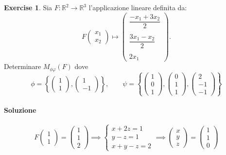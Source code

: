 \documentclass{article}
\theoremstyle{plain}
\theoremstyle{definition}
\newtheorem{xca}[exmp]{Exercise}
\theoremstyle{remark}
\begin{document}
\begin{bxthm}
\begin{xca}
    Sia $F:\mathbb{R}^2\to\mathbb{R}^3$ l'applicazione lineare definita da:
    \[F\begin{pmatrix}
        x_1\\
        x_2
    \end{pmatrix}\mapsto\begin{pmatrix}
        \dfrac{-x_1+3x_2}{2}\\\\
        \dfrac{3x_1-x_2}{2}\\\\
        2x_1
    \end{pmatrix}.\]
    Determinare $M_{\phi\varphi}(F)$ dove 
    \[\phi=\left\{\begin{pmatrix}
        1\\
        1
    \end{pmatrix},\begin{pmatrix}
        1\\
        -1
    \end{pmatrix}\right\}, \quad\quad  \psi=\left\{\begin{pmatrix}
        1\\
        0\\
        1
    \end{pmatrix},\begin{pmatrix}
        0\\
        1\\
        1
    \end{pmatrix},\begin{pmatrix}
        2\\
        -1\\
        -1
    \end{pmatrix}\right\}
    \]
\end{xca}
\end{bxthm}
\paragraph{Soluzione}
\[F\begin{pmatrix}1\\1\end{pmatrix}=\begin{pmatrix}1\\1\\2\end{pmatrix}\implies
\begin{cases}
    x+2z=1\\
    y-z=1\\
    x+y-z=2
\end{cases}\implies \begin{pmatrix}x\\y\\z\end{pmatrix} = \begin{pmatrix}1\\1\\0\end{pmatrix}\]
\end{document}
